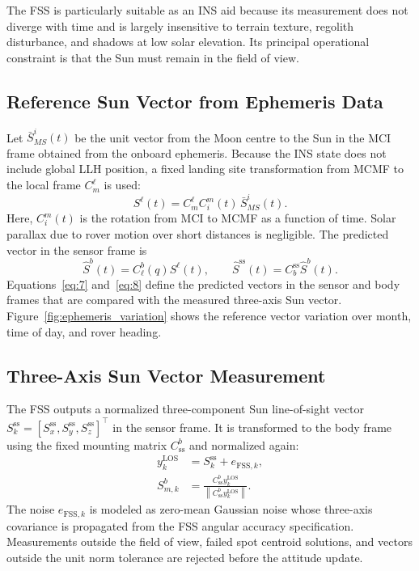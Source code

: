 \documentclass[]{IAC_style}
\begin{document}
The FSS is particularly suitable as an INS aid because its measurement does not diverge with time and is largely insensitive to terrain texture, regolith disturbance, and shadows at low solar elevation. Its principal operational constraint is that the Sun must remain in the field of view.

\subsection{Reference Sun Vector from Ephemeris Data}

Let $\bar S_{MS}^i(t)$ be the unit vector from the Moon centre to the Sun in the MCI frame obtained from the onboard ephemeris. Because the INS state does not include global LLH position, a fixed landing site transformation from MCMF to the local frame $C_m^\ell$ is used:
\begin{equation}
\tag{7}\label{eq:7}
S^{\ell}(t)=C_m^\ell C_i^m(t)\,\bar S_{MS}^i(t).
\end{equation}
Here, $C_i^m(t)$ is the rotation from MCI to MCMF as a function of time. Solar parallax due to rover motion over short distances is negligible. The predicted vector in the sensor frame is
\begin{equation}
\tag{8}\label{eq:8}
\hat S^b(t)=C_\ell^b(q)S^{\ell}(t),\qquad \hat S^{\mathrm{ss}}(t)=C_b^{\mathrm{ss}}\hat S^b(t).
\end{equation}
Equations~\eqref{eq:7} and~\eqref{eq:8} define the predicted vectors in the sensor and body frames that are compared with the measured three-axis Sun vector. Figure~\ref{fig:ephemeris_variation} shows the reference vector variation over month, time of day, and rover heading.

\subsection{Three-Axis Sun Vector Measurement}

The FSS outputs a normalized three-component Sun line-of-sight vector $S_k^{\mathrm{ss}}=[S_x^{\mathrm{ss}},S_y^{\mathrm{ss}},S_z^{\mathrm{ss}}]^\top$ in the sensor frame. It is transformed to the body frame using the fixed mounting matrix $C_{\mathrm{ss}}^b$ and normalized again:
\begin{equation}
\tag{9}\label{eq:9}
\begin{aligned}
y_k^{\mathrm{LOS}}&=S_k^{\mathrm{ss}}+e_{\mathrm{FSS},k},\\
S_{m,k}^{b}&=
\frac{C_{\mathrm{ss}}^{b}y_k^{\mathrm{LOS}}}
{\left\lVert C_{\mathrm{ss}}^{b}y_k^{\mathrm{LOS}}\right\rVert}.
\end{aligned}
\end{equation}
The noise $e_{\mathrm{FSS},k}$ is modeled as zero-mean Gaussian noise whose three-axis covariance is propagated from the FSS angular accuracy specification. Measurements outside the field of view, failed spot centroid solutions, and vectors outside the unit norm tolerance are rejected before the attitude update.
\end{document}
